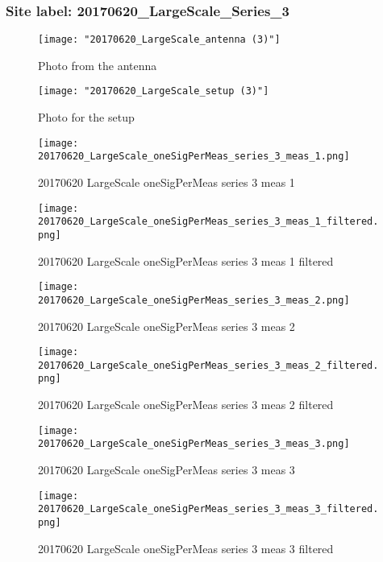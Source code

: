 \subsubsection{Site label: 20170620\_LargeScale\_Series\_3}
\begin{figure}[ht] \caption{Photo from the antenna}
\texttt{[image: "20170620\_LargeScale\_antenna (3)"]}\centering\end{figure}
\begin{figure}[ht] \caption{Photo for the setup}
\texttt{[image: "20170620\_LargeScale\_setup (3)"]}\centering\end{figure}
\begin{figure}[ht] \caption{20170620 LargeScale oneSigPerMeas series 3 meas 1}
\texttt{[image: 20170620\_LargeScale\_oneSigPerMeas\_series\_3\_meas\_1.png]}\centering\end{figure}
\begin{figure}[ht] \caption{20170620 LargeScale oneSigPerMeas series 3 meas 1 filtered}
\texttt{[image: 20170620\_LargeScale\_oneSigPerMeas\_series\_3\_meas\_1\_filtered.png]}\centering\end{figure}
\begin{figure}[ht] \caption{20170620 LargeScale oneSigPerMeas series 3 meas 2}
\texttt{[image: 20170620\_LargeScale\_oneSigPerMeas\_series\_3\_meas\_2.png]}\centering\end{figure}
\begin{figure}[ht] \caption{20170620 LargeScale oneSigPerMeas series 3 meas 2 filtered}
\texttt{[image: 20170620\_LargeScale\_oneSigPerMeas\_series\_3\_meas\_2\_filtered.png]}\centering\end{figure}
\begin{figure}[ht] \caption{20170620 LargeScale oneSigPerMeas series 3 meas 3}
\texttt{[image: 20170620\_LargeScale\_oneSigPerMeas\_series\_3\_meas\_3.png]}\centering\end{figure}
\begin{figure}[ht] \caption{20170620 LargeScale oneSigPerMeas series 3 meas 3 filtered}
\texttt{[image: 20170620\_LargeScale\_oneSigPerMeas\_series\_3\_meas\_3\_filtered.png]}\centering\end{figure}
\clearpage
